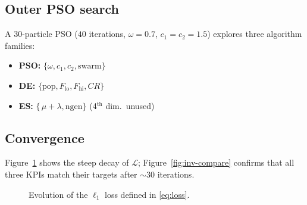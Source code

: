 \documentclass[sigconf]{acmart}
\begin{document}
	\subsection{Outer PSO search}
	A 30-particle PSO ($40$ iterations,
	$\omega\!=\!0.7$, $c_1\!=c_2\!=\!1.5$)
	explores three algorithm families:
	
	\begin{itemize}
		\item \textbf{PSO:} $\{\omega,c_1,c_2,\text{swarm}\}$
		\item \textbf{DE:}\; $\{\text{pop},F_\mathrm{lo},F_\mathrm{hi},CR\}$
		\item \textbf{ES:}\; $\{\,\mu+\lambda,\text{ngen}\}$ (4${}^{\text{th}}$ dim.\ unused)
	\end{itemize}
	
	\subsection{Convergence}
	Figure~\ref{fig:loss-curve} shows the steep decay of
	$\mathcal L$; Figure~\ref{fig:inv-compare} confirms that all
	three KPIs match their targets after $\sim$30 iterations.
	
	\begin{figure}[H]
		\centering
		\caption{Evolution of the $\ell_1$ loss
			defined in \eqref{eq:loss}.}
		\label{fig:loss-curve}
	\end{figure}
	
\end{document}
